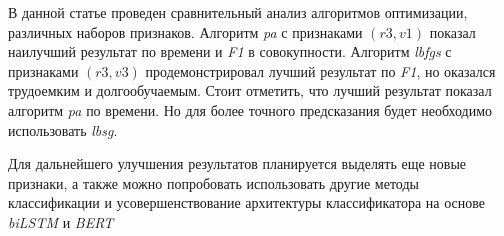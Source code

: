 \documentclass{csmathnotes}
\begin{document}
В данной статье проведен сравнительный анализ алгоритмов оптимизации, различных наборов признаков. Алгоритм \emph{pa} с признаками $(r3, v1)$ показал наилучший результат по времени и \emph{F1}  в совокупности. Алгоритм \emph{lbfgs}  с признаками $(r3, v3)$ продемонстрировал лучший результат по \emph{F1}, но оказался трудоемким и долгообучаемым. Стоит отметить, что лучший результат показал алгоритм \emph{pa} по времени. Но для более точного предсказания будет необходимо использовать \emph{lbsg}.


Для дальнейшего улучшения результатов планируется выделять еще новые признаки, а также можно попробовать использовать другие методы классификации и усовершенствование архитектуры классификатора на основе \emph{biLSTM} и \emph{BERT}

\printbibliography
\end{document}
